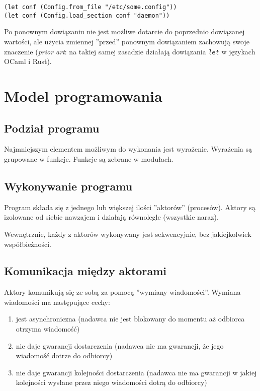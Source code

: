 \documentclass[11pt,oneside,a4paper,titlepage,onecolumn]{article}
\begin{document}
\begin{lstlisting}
(let conf (Config.from_file "/etc/some.config"))
(let conf (Config.load_section conf "daemon"))
\end{lstlisting}

Po ponownym dowiązaniu nie jest możliwe dotarcie do poprzednio dowiązanej wartości, ale użycia zmiennej
''przed'' ponownym dowiązaniem zachowują swoje znaczenie (\emph{prior art}: na takiej samej zasadzie działają
dowiązania \emph{\texttt{let}} w językach OCaml i Rust).

\newpage
\section{Model programowania}

\subsection{Podział programu}

Najmniejszym elementem możliwym do wykonania jest wyrażenie.
Wyrażenia są grupowane w funkcje.
Funkcje są zebrane w modułach.

\subsection{Wykonywanie programu}

Program składa się z jednego lub większej ilości ''aktorów'' (procesów).
Aktory są izolowane od siebie nawzajem i działają równolegle (wszystkie naraz).

Wewnętrznie, każdy z aktorów wykonywany jest sekwencyjnie, bez jakiejkolwiek
współbieżności.

\subsection{Komunikacja między aktorami}

Aktory komunikują się ze sobą za pomocą ''wymiany wiadomości''.
Wymiana wiadomości ma następujące cechy:

\begin{enumerate}
    \item jest asynchroniczna (nadawca nie jest blokowany do momentu aż odbiorca otrzyma
        wiadomość)
    \item nie daje gwarancji dostarczenia (nadawca nie ma gwarancji, że jego wiadomość
        dotrze do odbiorcy)
    \item nie daje gwarancji kolejności dostarczenia (nadawca nie ma gwarancji w jakiej
        kolejności wysłane przez niego wiadomości dotrą do odbiorcy)
\end{enumerate}
\end{document}
